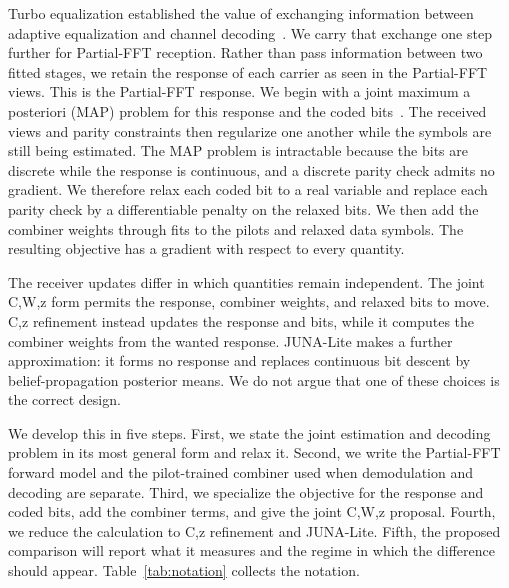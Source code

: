 \documentclass[conference]{IEEEtran}
\begin{document}
Turbo equalization established the value of exchanging information between
adaptive equalization and channel decoding~\cite{laot,zheng}.  We carry that
exchange one step further for Partial-FFT reception.  Rather than pass
information between two fitted stages, we retain the response of each carrier
as seen in the Partial-FFT views.  This is the Partial-FFT response.  We begin
with a joint maximum a posteriori (MAP) problem for this response and the coded
bits~\cite{juna}.  The received views and parity constraints then regularize
one another while the symbols are still being estimated.  The MAP problem is
intractable because the bits are discrete while the response is continuous,
and a discrete parity check admits no gradient.  We therefore relax each coded
bit to a real variable and replace each parity check by a differentiable
penalty on the relaxed bits.  We then add the combiner weights through fits to
the pilots and relaxed data symbols.  The resulting objective has a gradient
with respect to every quantity.

The receiver updates differ in which quantities remain independent.  The joint
C,W,z form permits the response, combiner weights, and relaxed bits to move.
C,z refinement instead updates the response and bits, while it computes the
combiner weights from the wanted response.  JUNA-Lite makes a further
approximation: it forms no response and replaces continuous bit descent by
belief-propagation posterior means.  We do not argue that one of these choices
is the correct design.

We develop this in five steps.  First, we state the joint estimation and
decoding problem in its most general form and relax it.  Second, we write
the Partial-FFT forward model and the pilot-trained combiner used when
demodulation and decoding are separate.  Third, we specialize the objective
for the response and coded bits, add the combiner terms, and give the joint
C,W,z proposal.  Fourth, we reduce the calculation to C,z refinement and
JUNA-Lite.  Fifth, the proposed comparison will report what it measures and
the regime in which the difference should appear.  Table~\ref{tab:notation}
collects the notation.
\end{document}
